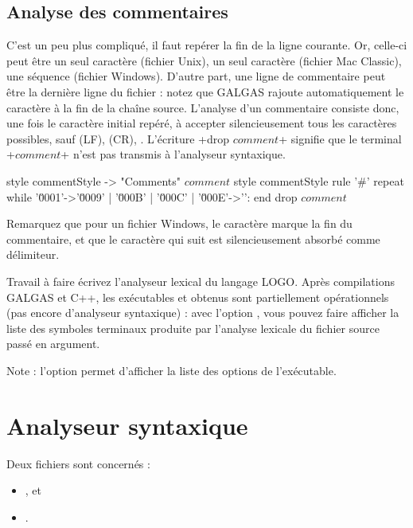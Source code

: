 \subsection{Analyse des commentaires}
C'est un peu plus compliqué, il faut repérer la fin de la ligne courante. Or, celle-ci peut être un seul caractère  (fichier Unix), un seul caractère  (fichier Mac Classic), une séquence  (fichier Windows). D'autre part, une ligne de commentaire peut être la dernière ligne du fichier : notez que GALGAS rajoute automatiquement le caractère \tpp{\textquotesingle\textbackslash 0\textquotesingle} à la fin de la chaîne source. L'analyse d'un commentaire consiste donc, une fois le caractère initial \tpp{\textquotesingle\textbackslash\#\textquotesingle} repéré, à accepter silencieusement tous les caractères possibles, sauf  (LF),  (CR), . L’écriture \ggs+drop $comment$+ signifie que le terminal \ggs+$comment$+ n’est pas transmis à l’analyseur syntaxique.

\begin{galgas}
style commentStyle -> "Comments"
$comment$ style commentStyle %
rule '#' {
  repeat
  while '\u0001'->'\u0009' | '\u000B' | '\u000C' | '\u000E'->'\uFFFD':
  end
  drop $comment$
}
\end{galgas}

Remarquez que pour un fichier Windows, le caractère  marque la fin du commentaire, et que le caractère  qui suit est silencieusement absorbé comme délimiteur.

Travail à faire
écrivez l'analyseur lexical du langage LOGO. Après compilations GALGAS et C++, les exécutables  et  obtenus sont partiellement opérationnels (pas encore d’analyseur syntaxique) : avec l'option , vous pouvez faire afficher la liste des symboles terminaux produite par l'analyse lexicale du fichier source passé en argument.

Note : l'option  permet d'afficher la liste des options de l'exécutable. 

\section{Analyseur syntaxique}

Deux fichiers sont concernés :
\begin{itemize}
  \item {}, et
  \item {}.
\end{itemize}

